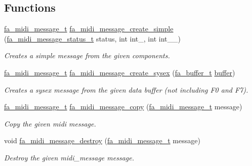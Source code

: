 \subsection*{Functions}
\begin{DoxyCompactItemize}
\item 
\hyperlink{group___fa_midi_message_gaa73293eb40a2cffdc2294e3cb6dc2564}{fa\-\_\-midi\-\_\-message\-\_\-t} \hyperlink{group___fa_midi_message_ga8f2f770703788aabdf9100161560d0de}{fa\-\_\-midi\-\_\-message\-\_\-create\-\_\-simple} (\hyperlink{group___fa_midi_message_gaf34878eefb2ec676b7894176528d5b05}{fa\-\_\-midi\-\_\-message\-\_\-status\-\_\-t} status, int int\-\_\-, int int\-\_\-\-\_\-)
\begin{DoxyCompactList}\small\item\em Creates a simple message from the given components. \end{DoxyCompactList}\item 
\hyperlink{group___fa_midi_message_gaa73293eb40a2cffdc2294e3cb6dc2564}{fa\-\_\-midi\-\_\-message\-\_\-t} \hyperlink{group___fa_midi_message_ga54d41c4ec0d77e9683ed1722cd4a9deb}{fa\-\_\-midi\-\_\-message\-\_\-create\-\_\-sysex} (\hyperlink{group___fa_buffer_ga0ed7a1d783ab322e2e8be02432d0839e}{fa\-\_\-buffer\-\_\-t} \hyperlink{util_8h_ad0c623e8b04565926f5b48888327724a}{buffer})
\begin{DoxyCompactList}\small\item\em Creates a sysex message from the given data buffer (not including F0 and F7). \end{DoxyCompactList}\item 
\hyperlink{group___fa_midi_message_gaa73293eb40a2cffdc2294e3cb6dc2564}{fa\-\_\-midi\-\_\-message\-\_\-t} \hyperlink{group___fa_midi_message_ga3054f30aab3248d85dcfa449a40a74ad}{fa\-\_\-midi\-\_\-message\-\_\-copy} (\hyperlink{group___fa_midi_message_gaa73293eb40a2cffdc2294e3cb6dc2564}{fa\-\_\-midi\-\_\-message\-\_\-t} message)
\begin{DoxyCompactList}\small\item\em Copy the given midi message. \end{DoxyCompactList}\item 
void \hyperlink{group___fa_midi_message_gaf8efe0ff27b3877bbdc47f6c1c0c95ec}{fa\-\_\-midi\-\_\-message\-\_\-destroy} (\hyperlink{group___fa_midi_message_gaa73293eb40a2cffdc2294e3cb6dc2564}{fa\-\_\-midi\-\_\-message\-\_\-t} message)
\begin{DoxyCompactList}\small\item\em Destroy the given midi\-\_\-message message. \end{DoxyCompactList}\item 

\end{DoxyCompactItemize}
